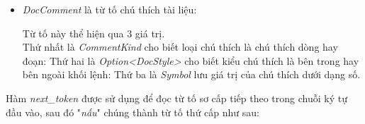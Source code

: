 \begin{itemize}
  \item \textit{DocComment} là từ tố chú thích tài liệu:
  
        Từ tố này thể hiện qua 3 giá trị. 
        \\Thứ nhất là \textit{CommentKind} cho biết loại chú thích là chú thích dòng hay đoạn:
        Thứ hai là \textit{Option<DocStyle>} cho biết kiểu chú thích là bên trong hay bên ngoài khối lệnh:
        Thứ ba là \textit{Symbol} lưu giá trị của chú thích dưới dạng số.
\end{itemize}

Hàm \textit{next\_token} được sử dụng để đọc từ tố sơ cấp tiếp theo trong chuỗi ký tự đầu vào, sau đó "\textit{nấu}" chúng thành từ tố thứ cấp như sau:

